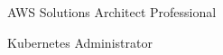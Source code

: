 \documentclass[11pt, a4paper]{awesome-cv}
\begin{document}

\begin{cvhonors}

  \cvhonor
    {AWS Solutions Architect Professional}
    {}{}{}

  \cvhonor
    {Kubernetes Administrator}
    {}{}{}

\end{cvhonors}



\end{document}
